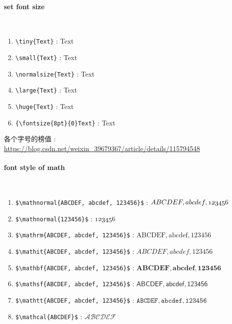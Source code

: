 \paragraph{set font size}~{}

\begin{enumerate}[topsep=0pt,itemsep=0pt,parsep=0pt,leftmargin=3.6em,label=\arabic*>]
    \item \verb=\tiny{Text}= : {\tiny{Text}}
    \item \verb=\small{Text}= : {\small{Text}}
    \item \verb=\normalsize{Text}= : {\normalsize{Text}}
    \item \verb=\large{Text}= : {\large{Text}}
    \item \verb=\huge{Text}= : {\huge{Text}}
    \item \verb={\fontsize{8pt}{0}Text}= : {\fontsize{8pt}{0}Text}
\end{enumerate}

各个字号的榜值 : \url{https://blog.csdn.net/weixin_39679367/article/details/115794548}

\paragraph{font style of math}~{}

\begin{enumerate}[topsep=0pt,itemsep=0pt,parsep=0pt,leftmargin=3.6em,label=\arabic*>]
    \item \verb=$\mathnormal{ABCDEF, abcdef, 123456}$= : {$\mathnormal{ABCDEF, abcdef, 123456}$}
    \item \verb=$\mathnormal{123456}$= : {$\mathnormal{123456}$}
    \item \verb=$\mathrm{ABCDEF, abcdef, 123456}$= : {$\mathrm{ABCDEF, abcdef, 123456}$}
    \item \verb=$\mathit{ABCDEF, abcdef, 123456}$= : {$\mathit{ABCDEF, abcdef, 123456}$}
    \item \verb=$\mathbf{ABCDEF, abcdef, 123456}$= : {$\mathbf{ABCDEF, abcdef, 123456}$}
    \item \verb=$\mathsf{ABCDEF, abcdef, 123456}$= : {$\mathsf{ABCDEF, abcdef, 123456}$}
    \item \verb=$\mathtt{ABCDEF, abcdef, 123456}$= : {$\mathtt{ABCDEF, abcdef, 123456}$}
    \item \verb=$\mathcal{ABCDEF}$= : {$\mathcal{ABCDEF}$}
\end{enumerate}

